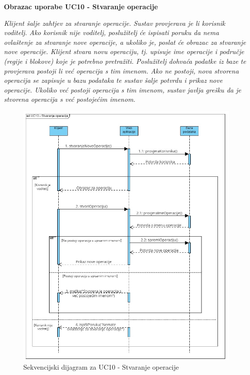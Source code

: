                 \eject

                \textbf{Obrazac uporabe UC10 - Stvaranje operacije}

                \textit{Klijent šalje zahtjev za stvaranje operacije. Sustav provjerava je li korisnik voditelj. Ako korisnik nije voditelj, poslužitelj će ispisati poruku da nema ovlaštenje za stvaranje nove operacije, a ukoliko je, poslat će obrazac za stvaranje nove operacije. Klijent stvara novu operaciju, tj. upisuje ime operacije i područje (regije i blokove) koje je potrebno pretražiti. Poslužitelj dohvaća podatke iz baze te provjerava postoji li već operacija s tim imenom. Ako ne postoji, nova stvorena operacija se zapisuje u bazu podataka te sustav šalje potvrdu i prikaz nove operacije. Ukoliko  već postoji operacija s tim imenom, sustav javlja grešku da je stvorena operacija s već postojećim imenom.}
                
                \begin{figure}[H] \includegraphics[width=\linewidth]{dokumentacija/dijagrami/StvaranjeOperacije.jpg}
				    \caption{Sekvencijski dijagram za UC10 - Stvaranje operacije}
				    \end{figure}

